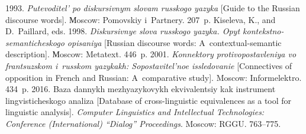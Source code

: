 
  \begin{multicols}{2}

\renewcommand{\bibname}{\protect\rmfamily References}

{\small\frenchspacing
 {%
 \begin{thebibliography}{99}
 1993. 
\textit{Putevoditel' po diskursivnym slovam russkogo yazyka} [Guide to the 
Russian discourse words]. Мoscow: Pomovskiy i~Partnery. 207~p.
Kiseleva, K., and D.~Paillard, eds. 1998. \textit{Diskursivnye slo\-va russkogo 
yazyka. Opyt kontekstno-semanticheskogo opisaniya} [Russian discourse 
words: A~contextual-semantic description]. Мoscow: Metatext. 446~p.
 2001. \textit{Konnektory protivopostavleniya 
vo frantsuzskom i~russkom yazykakh: Sopostavitel'noe issledovanie} 
[Connectives of opposition in French and Russian: A~comparative study]. 
Moscow: Informelektro. 434~p.
 2016. Baza dannykh mezh\-yazy\-ko\-vykh 
ekvivalentsiy kak instrument lingvisticheskogo ana\-li\-za [Database of  
cross-linguistic equivalences as a tool for linguistic analysis]. 
\textit{Computer Linguistics and 
Intellectual Technologies: Conference (International) ``Dialog'' Proceedings}. 
Moscow: RGGU. 763--775.


\end{thebibliography}}}
\end{multicols}
